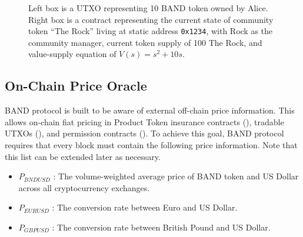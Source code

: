 \documentclass[letterpaper,11pt]{article}
\begin{document}
\begin{figure}[!h]
\centering
{}
\caption{Left box is a UTXO representing 10 BAND token owned by Alice. Right box is a contract representing the current state of community token ``The Rock'' living at static address {\tt 0x1234}, with Rock as the community manager, current token supply of 100 The Rock, and value-supply equation of $V(s) = s^2 + 10s$.}
\label{fig:utxo-contract-example}
\end{figure}

\subsection{On-Chain Price Oracle} \label{sec:on-chain-px-oracle}
BAND protocol is built to be aware of external off-chain price information. This allows on-chain fiat pricing in Product Token insurance contracts (), tradable UTXOs (), and permission contracts (). To achieve this goal, BAND protocol requires that every block must contain the following price information. Note that this list can be extended later as necessary.

\begin{itemize}
\setlength\itemsep{0em}
\item $P_{\mathit{BNDUSD}}$ : The volume-weighted average price of BAND token and US Dollar across all cryptocurrency exchanges.
\item $P_{\mathit{EURUSD}}$ : The conversion rate between Euro and US Dollar.
\item $P_{\mathit{GBPUSD}}$ : The conversion rate between British Pound and US Dollar.
\end{itemize}
\end{document}
